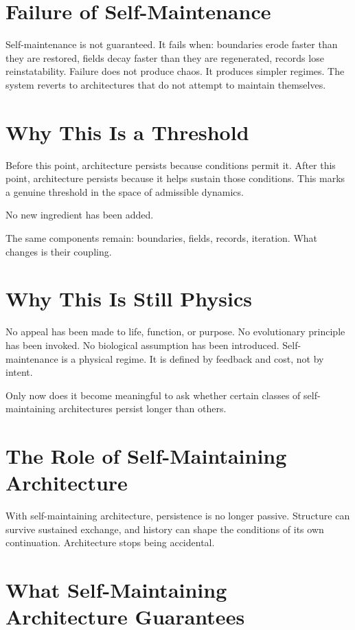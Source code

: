 \documentclass[11pt,twoside,openright]{book}
\begin{document}
\section*{Failure of Self-Maintenance}

Self-maintenance is not guaranteed. It fails when: boundaries erode faster than they are restored, fields decay faster than they are regenerated, records lose reinstatability. Failure does not produce chaos. It produces simpler regimes. The system reverts to architectures that do not attempt to maintain themselves.

\section*{Why This Is a Threshold}

Before this point, architecture persists because conditions permit it. After this point, architecture persists because it helps sustain those conditions. This marks a genuine threshold in the space of admissible dynamics.

No new ingredient has been added.

The same components remain: boundaries, fields, records, iteration. What changes is their coupling.

\section*{Why This Is Still Physics}

No appeal has been made to life, function, or purpose. No evolutionary principle has been invoked. No biological assumption has been introduced. Self-maintenance is a physical regime. It is defined by feedback and cost, not by intent.

Only now does it become meaningful to ask whether certain classes of self-maintaining architectures persist longer than others.

\section*{The Role of Self-Maintaining Architecture}

With self-maintaining architecture, persistence is no longer passive. Structure can survive sustained exchange, and history can shape the conditions of its own continuation. Architecture stops being accidental.

\section*{What Self-Maintaining Architecture Guarantees}
\end{document}
